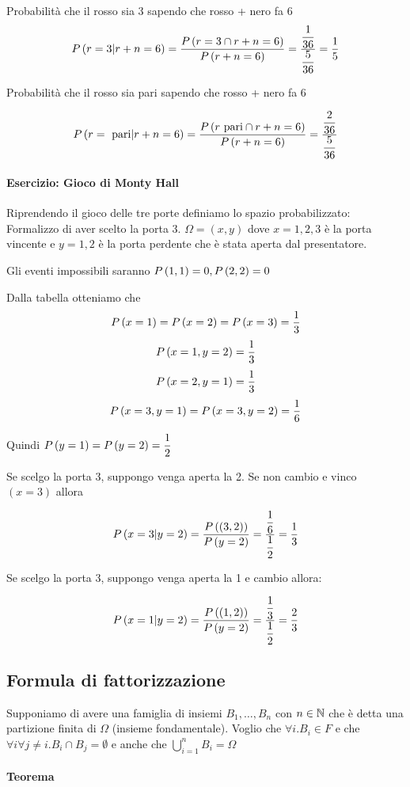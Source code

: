 Probabilità che il rosso sia 3 sapendo che rosso + nero fa 6
\[ P\left(r=3 | r+n = 6\right) = \dfrac{P\left(r=3 \cap r + n = 6\right)}{P\left(r+n=6\right)} = \dfrac{\dfrac{1}{36}}{\dfrac{5}{36}} = \dfrac{1}{5}\] 

Probabilità che il rosso sia pari sapendo che rosso + nero fa 6

\[ P\left(r = \text{ pari} | r+n = 6\right) = \dfrac{P\left(r \text{ pari} \cap r+n = 6\right)}{P\left(r+n = 6\right)} = \dfrac{\dfrac{2}{36}}{\dfrac{5}{36}} \]

\paragraph{Esercizio: Gioco di Monty Hall}
Riprendendo il gioco delle tre porte definiamo lo spazio probabilizzato: Formalizzo di aver scelto la porta 3. $ \Omega = (x,y) $ dove $ x = 1,2,3 $ è la porta vincente e $ y = 1,2 $ è la porta perdente che è stata aperta dal presentatore.

Gli eventi impossibili saranno $ P\left(1,1\right) = 0, P\left(2,2\right) = 0 $


Dalla tabella otteniamo che
\[ P\left(x=1\right) = P\left(x=2\right) = P\left(x=3\right) = \dfrac{1}{3} \]
\[ P\left(x=1,y=2\right) = \dfrac{1}{3} \]
\[ P\left(x=2,y=1\right) = \dfrac{1}{3} \]
\[ P\left(x=3,y=1\right) = P\left(x=3,y=2\right) = \dfrac{1}{6} \]

Quindi $ P\left(y=1\right) = P\left(y=2\right) = \dfrac{1}{2} $

Se scelgo la porta 3, suppongo venga aperta la 2. Se non cambio e vinco $ (x = 3) $ allora

\[ P\left(x=3 | y=2\right) = \dfrac{P\left((3,2)\right)}{P\left(y=2\right)} = \dfrac{\dfrac{1}{6}}{\dfrac{1}{2}} = \dfrac{1}{3} \]

Se scelgo la porta 3, suppongo venga aperta la 1 e cambio allora:

\[ P\left(x=1 | y=2\right) = \dfrac{P\left((1,2)\right)}{P\left(y=2\right)} = \dfrac{\dfrac{1}{3}}{\dfrac{1}{2}} = \dfrac{2}{3} \]

\subsection{Formula di fattorizzazione}
Supponiamo di avere una famiglia di insiemi $ B_1, \dots, B_n $ con $ n \in \mathbb{N} $ che è detta una partizione finita di $ \Omega $ (insieme fondamentale). Voglio che $ \forall i . B_i \in F $ e che $ \forall i \forall j\neq i . B_i \cap B_j = \emptyset $ e anche che $ \bigcup_{i=1}^{n} B_i = \Omega $

\paragraph{Teorema}

